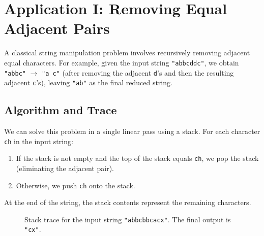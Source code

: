 \documentclass[10pt,journal,compsoc,onecolumn]{IEEEtran}
\begin{document}
\section{Application I: Removing Equal Adjacent Pairs}
\label{sec:adjacent_removal}
A classical string manipulation problem involves recursively removing adjacent equal characters. For example, given the input string \texttt{"abbcddc"}, we obtain \texttt{"abbc"} $\to$ \texttt{"a c"} (after removing the adjacent \texttt{d}'s and then the resulting adjacent \texttt{c}'s), leaving \texttt{"ab"} as the final reduced string.

\subsection{Algorithm and Trace}
We can solve this problem in a single linear pass using a stack. For each character \texttt{ch} in the input string:
\begin{enumerate}
    \item If the stack is not empty and the top of the stack equals \texttt{ch}, we pop the stack (eliminating the adjacent pair).
    \item Otherwise, we push \texttt{ch} onto the stack.
\end{enumerate}
At the end of the string, the stack contents represent the remaining characters.

\begin{figure}[htbp]
\centering
{}
\caption{Stack trace for the input string \texttt{"abbcbbcacx"}. The final output is \texttt{"cx"}.}
\label{fig:string_reduction_trace}
\end{figure}
\end{document}
